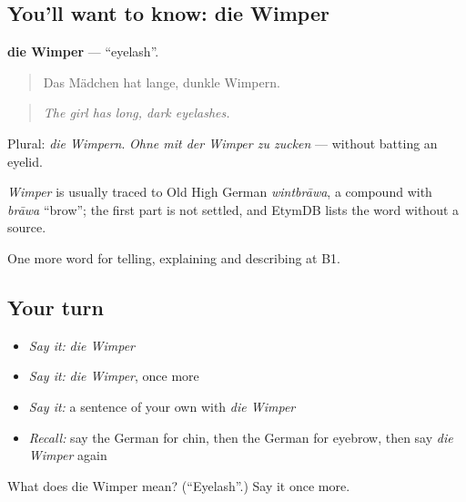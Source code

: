 \subsection*{You'll want to know: die Wimper}
\textbf{die Wimper} — \textquotedblleft{}eyelash\textquotedblright{}.

\begin{quote}
Das Mädchen hat lange, dunkle Wimpern.
\end{quote}

\begin{quote}
\emph{The girl has long, dark eyelashes.}
\end{quote}

Plural: \emph{die Wimpern}. \emph{Ohne mit der Wimper zu zucken} — without batting an eyelid.

\begin{cousinweb}
\emph{Wimper} is usually traced to Old High German \emph{wintbrāwa}, a compound with \emph{brāwa} \textquotedblleft{}brow\textquotedblright{}; the first part is not settled, and EtymDB lists the word without a source.
\end{cousinweb}

\begin{grammarlens}[title={What you've built}]
One more word for telling, explaining and describing at B1.
\end{grammarlens}

\subsection*{Your turn}
\begin{itemize}
\raggedright
  \item \emph{Say it:} \emph{die Wimper}
  \item \emph{Say it:} \emph{die Wimper}, once more
  \item \emph{Say it:} a sentence of your own with \emph{die Wimper}
  \item \emph{Recall:} say the German for chin, then the German for eyebrow, then say \emph{die Wimper} again
\end{itemize}

\begin{tcolorbox}[breakable,colback=teal!4,colframe=teal!35!black,title={Before you move on}]
What does die Wimper mean? (\textquotedblleft{}Eyelash\textquotedblright{}.) Say it once more.
\end{tcolorbox}
